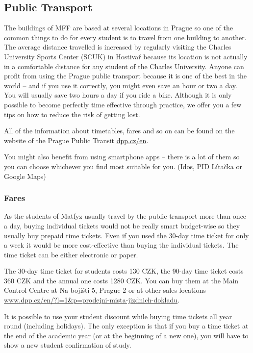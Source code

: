 \subsection{Public Transport}
The buildings of MFF are based at several locations in Prague so one of the
common things to do for every student is to travel from one building to another.
The average distance travelled is increased by regularly visiting the Charles
University Sports Center (SCUK) in Hostivař because its location is not actually
in a comfortable distance for any student of the Charles University.
Anyone can profit from using the Prague public transport because it is one of
the best in the world -- and if you use it correctly, you might even save an
hour or two a day. You will usually save two hours a day if you ride a bike.
Although it is only possible to become perfectly time effective through
practice, we offer you a few tips on how to reduce the risk of getting lost.

All of the information about timetables, fares and so on can be found on the
website of the Prague Public Transit \url{dpp.cz/en}.

You might also benefit from using smartphone apps -- there is a lot of them so
you can choose whichever you find most suitable for you. (Idos, PID Lítačka or
Google Maps)


\subsubsection{Fares}
As the students of Matfyz usually travel by the public transport more than once
a day, buying individual tickets would not be really smart budget-wise so they
usually buy prepaid time tickets.
Even if you used the 30-day time ticket for only a week it would be more
cost-effective than buying the individual tickets. The time ticket can be either
electronic or paper.

The 30-day time ticket for students costs 130 CZK, the 90-day time ticket costs
360 CZK and the annual one costs 1280 CZK.
You can buy them at the Main Control Centre at Na bojišti 5, Prague 2 or at
other sales locations
\url{www.dpp.cz/en/?l=1&p=prodejni-mista-jizdnich-dokladu}.

It is possible to use your student discount while buying time tickets all year
round (including holidays). The only exception is that if you buy a time ticket
at the end of the academic year (or at the beginning of a new one), you will
have to show a new student confirmation of study.

